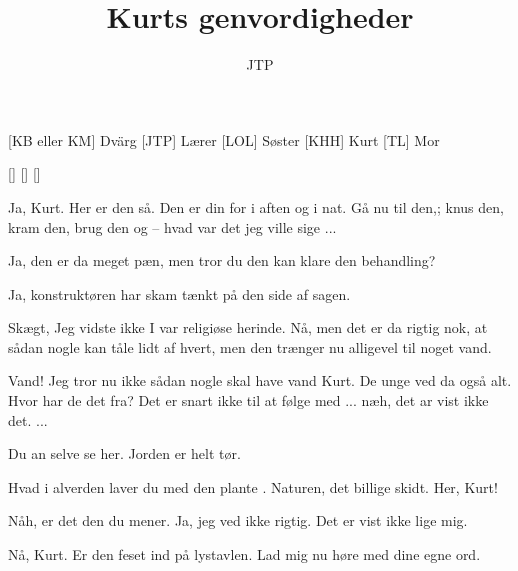 \documentclass[a4paper,11pt]{article}
\title{Kurts genvordigheder}
\author{JTP}
\begin{document}
\maketitle

\begin{roles}
[KB eller KM] Dvärg
[JTP] Lærer
[LOL] Søster
[KHH] Kurt
[TL] Mor
\end{roles}

\begin{props}
[]
[]
[]
\end{props}


\begin{sketch}

 Ja, Kurt. Her er den så. Den er din for i aften og i nat. Gå nu til
den,; knus den, kram den, brug den og -- hvad var det jeg ville sige
... 

  Ja, den er da meget pæn, men tror du den kan klare den behandling?

 Ja, konstruktøren har skam tænkt på den side af sagen.

 Skægt, Jeg vidste ikke I var religiøse herinde. Nå, men det er da
rigtig nok, at sådan nogle kan tåle lidt af hvert, men den trænger nu alligevel
til noget vand.

 Vand! Jeg tror nu ikke sådan nogle skal have vand Kurt.  De unge ved da også alt. Hvor har de det fra? Det er
snart ikke til at følge med ... næh, det ar vist ikke det. ...

  Du an selve se her. Jorden er
helt tør.

 Hvad i alverden laver du med den plante . Naturen, det billige skidt.  Her, Kurt!

 Nåh, er det den du mener. Ja, jeg ved ikke rigtig. Det er vist ikke
lige mig.


 Nå, Kurt. Er den feset ind på lystavlen. Lad mig nu høre med dine egne
ord.



\end{sketch}
\end{document}
